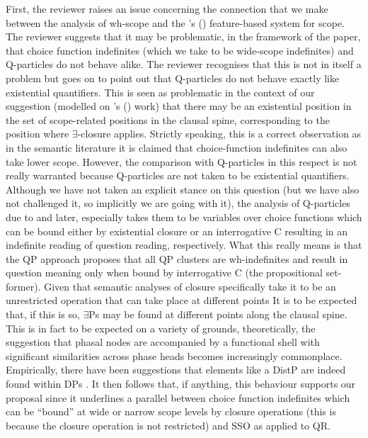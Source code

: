 \documentclass[11pt]{article}
\newcommand{\citeposs}[1]{\citeauthor{#1}'s (\citeyear{#1})}
\begin{document}
First, the reviewer raises an issue concerning the connection that we make between the analysis of wh-scope and the \citeposs{beghelli-stowell:1997a} feature-based system for scope.  The reviewer suggests that it may be problematic, in the framework of the paper, that choice function indefinites (which we take to be wide-scope indefinites) and Q-particles do not behave alike.  The reviewer recognises that this is not in itself a problem but goes on to point out that  Q-particles do not behave exactly like  existential quantifiers. This is seen as problematic in the context of our suggestion (modelled on \citeposs{kratzer:05} work) that there may be an existential position in the set of scope-related positions in the clausal spine, corresponding to the position where $\exists$-closure applies. Strictly speaking, this is a correct observation as in the semantic literature it is claimed that choice-function indefinites can also take lower scope. However, the comparison with Q-particles in this respect is not really warranted because Q-particles are not taken to be existential quantifiers.  Although we have not taken an explicit stance on this question (but we have also not challenged it, so implicitly we are going with it), the analysis of Q-particles due to \citet{hagstrom:1998} and later, especially \citet{cable:2007} takes them to be variables over choice functions which can be bound either by existential closure or an interrogative C resulting in an indefinite reading of question reading, respectively. What this really means is that the QP approach proposes that all QP clusters are wh-indefinites and result in question meaning only when bound by interrogative C (the propositional set-former). Given that semantic analyses of closure specifically take it to be an unrestricted operation that can take place at different points \citep[see most importantly,][and subsequent work]{Reinhart:1997, winter:1997a}  It is to be expected that, if this is so, $\exists$Ps may be found at different points along the clausal spine. This is in fact to be expected on a variety of grounds, theoretically, the suggestion that phasal nodes are accompanied by a functional shell with significant similarities across phase heads becomes increasingly commonplace.  Empirically, there have been suggestions that elements like a DistP are indeed found within DPs \citep[e.g.][]{etxepare:14, tsoulas-woods:19}. It then follows that, if anything, this behaviour supports our proposal since it underlines a parallel between choice function indefinites which can be ``bound'' at wide or narrow scope levels by closure operations (this is because the closure operation is not restricted) and SSO as applied to QR.
\end{document}
